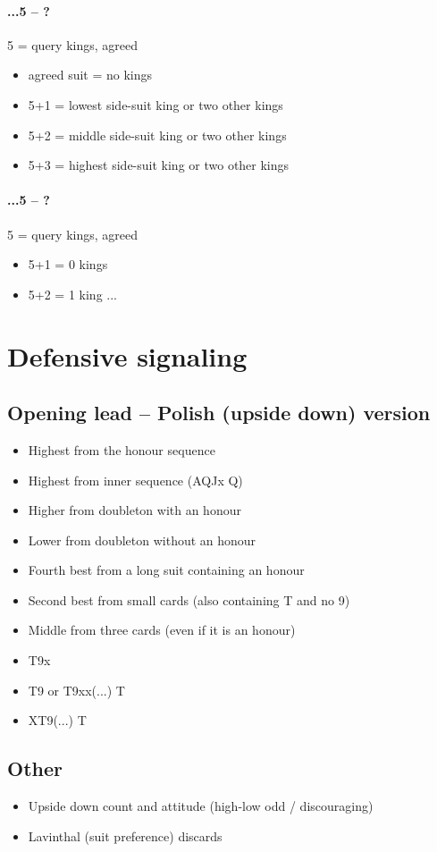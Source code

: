 \subsubsection*{...5 -- ?}
5 = query kings, \major agreed
\begin{itemize}
    \item agreed suit = no kings
    \item 5+1 = lowest side-suit king or two other kings
    \item 5+2 = middle side-suit king or two other kings
    \item 5+3 = highest side-suit king or two other kings
\end{itemize}

\subsubsection*{...5 -- ?}
5 = query kings, \minor agreed
\begin{itemize}
    \item 5+1 = 0 kings
    \item 5+2 = 1 king
    ...
\end{itemize}

\chapter{Defensive signaling}\label{chap:signaling}
\section{\texorpdfstring{Opening lead -- Polish (upside down) version}{lead}}\label{sec:lead}

\begin{itemize}
    \item Highest from the honour sequence
    \item Highest from inner sequence (AQJx \then Q)
    \item Higher from doubleton with an honour
    \item Lower from doubleton without an honour
    \item Fourth best from a long suit containing an honour
    \item Second best from small cards (also containing T and no 9)
    \item Middle from three cards (even if it is an honour)
    \item T9x 
    \item T9 or T9xx(...) \then T
    \item XT9(...) \then T
\end{itemize}

\section{\texorpdfstring{Other}{defensiveSignaling}}\label{sec:defensiveSignaling}

\begin{itemize}
    \item Upside down count and attitude (high-low odd / discouraging)
    \item Lavinthal (suit preference) discards
\end{itemize}

